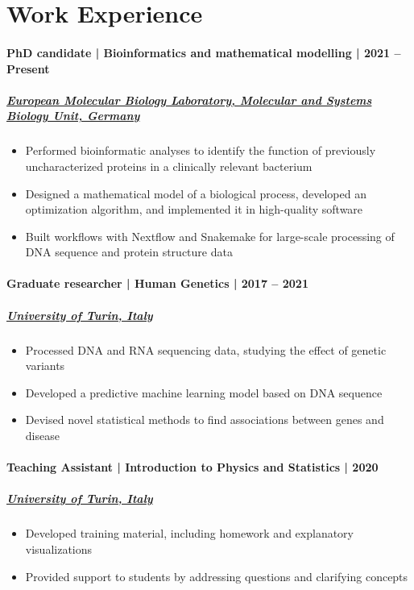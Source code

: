 \documentclass[
	DIV=15,
]{scrartcl}
\begin{document}
\section*{Work Experience}

\paragraph{PhD candidate | Bioinformatics and mathematical modelling | 2021 -- Present}
\subparagraph{\href{https://embl.org/groups/bork}{European Molecular Biology Laboratory, Molecular and Systems Biology Unit, Germany}}
\begin{itemize}
	\item Performed bioinformatic analyses to identify the function of previously uncharacterized proteins in a clinically relevant bacterium
	\item Designed a mathematical model of a biological process, developed an optimization algorithm, and implemented it in high-quality software
	\item Built workflows with Nextflow and Snakemake for large-scale processing of DNA sequence and protein structure data
\end{itemize}

\paragraph{Graduate researcher | Human Genetics | 2017 -- 2021}
\subparagraph{\href{https://unito.it}{University of Turin, Italy}}
\begin{itemize}
	\item Processed DNA and RNA sequencing data, studying the effect of genetic variants
	\item Developed a predictive machine learning model based on DNA sequence
	\item Devised novel statistical methods to find associations between genes and disease
\end{itemize}

\paragraph{Teaching Assistant | Introduction to Physics and Statistics | 2020}
\subparagraph{\href{https://unito.it}{University of Turin, Italy}}
\begin{itemize}
	\item Developed training material, including homework and explanatory visualizations
	\item Provided support to students by addressing questions and clarifying concepts
\end{itemize}
\end{document}
